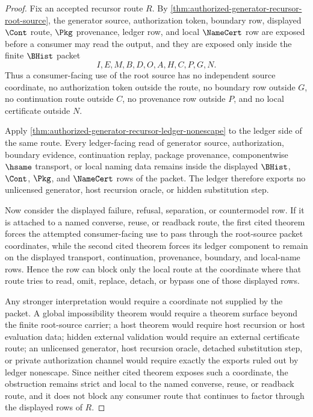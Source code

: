 \begin{proof}
Fix an accepted recursor route $R$. By \autoref{thm:authorized-generator-recursor-root-source}, the generator source, authorization token, boundary row, displayed $\Cont$ route, $\Pkg$ provenance, ledger row, and local $\NameCert$ row are exposed before a consumer may read the output, and they are exposed only inside the finite $\BHist$ packet
$$
I,E,M,B,D,O,A,H,C,P,G,N.
$$
Thus a consumer-facing use of the root source has no independent source coordinate, no authorization token outside the route, no boundary row outside $G$, no continuation route outside $C$, no provenance row outside $P$, and no local certificate outside $N$.

Apply \autoref{thm:authorized-generator-recursor-ledger-nonescape} to the ledger side of the same route. Every ledger-facing read of generator source, authorization, boundary evidence, continuation replay, package provenance, componentwise $\hsame$ transport, or local naming data remains inside the displayed $\BHist$, $\Cont$, $\Pkg$, and $\NameCert$ rows of the packet. The ledger therefore exports no unlicensed generator, host recursion oracle, or hidden substitution step.

Now consider the displayed failure, refusal, separation, or countermodel row. If it is attached to a named converse, reuse, or readback route, the first cited theorem forces the attempted consumer-facing use to pass through the root-source packet coordinates, while the second cited theorem forces its ledger component to remain on the displayed transport, continuation, provenance, boundary, and local-name rows. Hence the row can block only the local route at the coordinate where that route tries to read, omit, replace, detach, or bypass one of those displayed rows.

Any stronger interpretation would require a coordinate not supplied by the packet. A global impossibility theorem would require a theorem surface beyond the finite root-source carrier; a host theorem would require host recursion or host evaluation data; hidden external validation would require an external certificate route; an unlicensed generator, host recursion oracle, detached substitution step, or private authorization channel would require exactly the exports ruled out by ledger nonescape. Since neither cited theorem exposes such a coordinate, the obstruction remains strict and local to the named converse, reuse, or readback route, and it does not block any consumer route that continues to factor through the displayed rows of $R$.
\end{proof}
